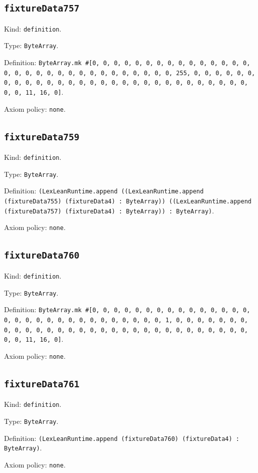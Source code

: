 \documentclass[11pt]{article}
\begin{document}
\subsection*{\texttt{fixtureData757}}
\noindent Kind: \texttt{definition}.\par
\noindent Type: \texttt{ByteArray}.\par
\noindent Definition: \texttt{ByteArray.mk \#[0, 0, 0, 0, 0, 0, 0, 0, 0, 0, 0, 0, 0, 0, 0, 0, 0, 0, 0, 0, 0, 0, 0, 0, 0, 0, 0, 0, 0, 0, 0, 255, 0, 0, 0, 0, 0, 0, 0, 0, 0, 0, 0, 0, 0, 0, 0, 0, 0, 0, 0, 0, 0, 0, 0, 0, 0, 0, 0, 0, 0, 0, 0, 11, 16, 0]}.\par
\noindent Axiom policy: \texttt{none}.\par
\subsection*{\texttt{fixtureData759}}
\noindent Kind: \texttt{definition}.\par
\noindent Type: \texttt{ByteArray}.\par
\noindent Definition: \texttt{(LexLeanRuntime.append ((LexLeanRuntime.append (fixtureData755) (fixtureData4) : ByteArray)) ((LexLeanRuntime.append (fixtureData757) (fixtureData4) : ByteArray)) : ByteArray)}.\par
\noindent Axiom policy: \texttt{none}.\par
\subsection*{\texttt{fixtureData760}}
\noindent Kind: \texttt{definition}.\par
\noindent Type: \texttt{ByteArray}.\par
\noindent Definition: \texttt{ByteArray.mk \#[0, 0, 0, 0, 0, 0, 0, 0, 0, 0, 0, 0, 0, 0, 0, 0, 0, 0, 0, 0, 0, 0, 0, 0, 0, 0, 0, 0, 0, 0, 1, 0, 0, 0, 0, 0, 0, 0, 0, 0, 0, 0, 0, 0, 0, 0, 0, 0, 0, 0, 0, 0, 0, 0, 0, 0, 0, 0, 0, 0, 0, 0, 0, 11, 16, 0]}.\par
\noindent Axiom policy: \texttt{none}.\par
\subsection*{\texttt{fixtureData761}}
\noindent Kind: \texttt{definition}.\par
\noindent Type: \texttt{ByteArray}.\par
\noindent Definition: \texttt{(LexLeanRuntime.append (fixtureData760) (fixtureData4) : ByteArray)}.\par
\noindent Axiom policy: \texttt{none}.\par
\end{document}
